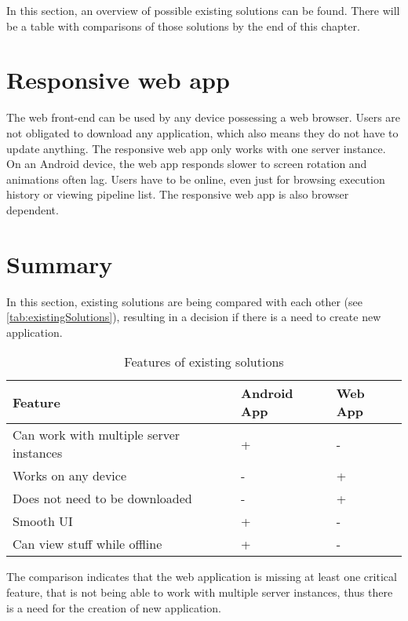 In this section, an overview of possible existing solutions can be found. There will be a table with comparisons of those solutions by the end of this chapter.

\section{Responsive web app}
The web front-end can be used by any device possessing a web browser.
Users are not obligated to download any application, which also means they do not have to update anything.
The responsive web app only works with one server instance.
On an Android device, the web app responds slower to screen rotation and animations often lag.
Users have to be online, even just for browsing execution history or viewing pipeline list.
The responsive web app is also browser dependent.

\section{Summary}
In this section, existing solutions are being compared with each other (see \autoref{tab:existingSolutions}), resulting in a decision if there is a need to create new application.

\begin{table}[ht]\centering
\caption[Existing solutions]{Features of existing solutions}\label{tab:existingSolutions}
\begin{tabular}{l|l|l}
\hline
\textbf{Feature} & \textbf{Android App} & \textbf{Web App} \\ \hline
Can work with multiple server instances & + & - \\ \hline
Works on any device & - & + \\ \hline
Does not need to be downloaded & - & + \\ \hline
Smooth UI & + & - \\ \hline
Can view stuff while offline & + & - \\ \hline
\end{tabular}
\end{table}

The comparison indicates that the web application is missing at least one critical feature, that is not being able to work with multiple server instances, thus there is a need for the creation of new application.